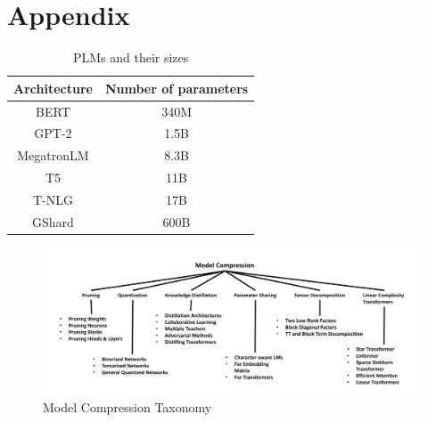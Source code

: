 \documentclass{article}
\begin{document}
\clearpage
\appendix
\section{Appendix}

\begin{table}[htbp]
\centering
  \begin{tabular}{cc}
    \toprule
    Architecture & Number of parameters\\
    \midrule
    BERT & 340M\\
    GPT-2 & 1.5B\\
    MegatronLM & 8.3B\\
    T5 & 11B\\
    T-NLG & 17B\\
    GShard & 600B\\
    \bottomrule
  \end{tabular}
  \caption{PLMs and their sizes\cite{gupta2020compression}}\label{plmsize}
\end{table}

\begin{figure}[h]
  \centering
  \includegraphics[width=\textwidth]{illustrations/modelcompressiontaxonomy}
  \caption{Model Compression Taxonomy\cite{gupta2020compression}}\label{fig:modelcompression}
\end{figure}

\end{document}
